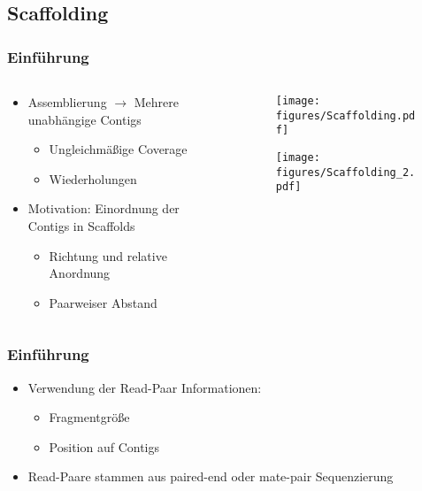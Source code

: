 \documentclass[xcolor=pst]{beamer}
\begin{document}
\subsection{Scaffolding}
\begin{frame}
\setcounter{framenumber}{1}
  \frametitle{Einführung}

  \begin{columns}
    \begin{column}{.45\textwidth}
      \begin{itemize}
      \item Assemblierung $\rightarrow$ Mehrere unabhängige Contigs
      \begin{itemize}
        \item Ungleichmäßige Coverage
        \item Wiederholungen
      \end{itemize}
      \item Motivation: Einordnung der Contigs in Scaffolds
      \begin{itemize}
        \item Richtung und relative Anordnung
        \item Paarweiser Abstand
      \end{itemize}
      \end{itemize}
    \end{column}
    \begin{column}{.45\textwidth}
      \begin{center}
        \begin{figure}[t]
          \texttt{[image: figures/Scaffolding.pdf]}
        \end{figure}
        \vspace{.75cm}
        \begin{figure}[t]
          \texttt{[image: figures/Scaffolding\_2.pdf]}
        \end{figure}
      \end{center}
    \end{column}
  \end{columns}
  \let\thefootnote\relax{}
\end{frame}

\begin{frame}
  \frametitle{Einführung}
  \begin{itemize}
  \item Verwendung der Read-Paar Informationen:
    \begin{itemize}
    \item Fragmentgröße
    \item Position auf Contigs
    \end{itemize}
  \item Read-Paare stammen aus paired-end oder mate-pair Sequenzierung
  \end{itemize}
\end{frame}
\end{document}
